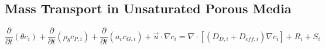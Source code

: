 \subsection{Mass Transport in Unsaturated Porous Media}\label{sec:mass_transport}

\begin{equation}
  \frac{\partial}{\partial t} (\theta c_i) +
  \frac{\partial}{\partial t} (\rho_b c_{P,i}) +
  \frac{\partial}{\partial t} (a_v c_{G,i}) +
  \vec{u} \cdot \nabla c_i =
  \nabla \cdot [(D_{D,i} + D_{eff,i}) \nabla c_i] +
  R_i + S_i
\end{equation}
